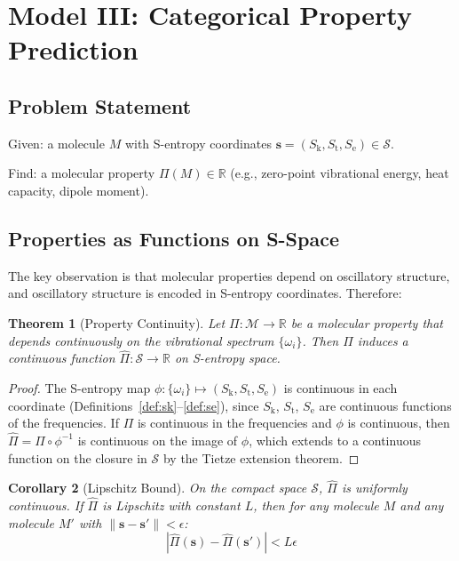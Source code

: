 \documentclass[11pt,twocolumn,a4paper]{article}
\newtheorem{theorem}{Theorem}[section]
\newtheorem{corollary}[theorem]{Corollary}
\theoremstyle{definition}
\theoremstyle{remark}
\newcommand{\Sk}{S_{\mathrm{k}}}
\newcommand{\St}{S_{\mathrm{t}}}
\newcommand{\Se}{S_{\mathrm{e}}}
\newcommand{\Sspace}{\mathcal{S}}
\newcommand{\Real}{\mathbb{R}}
\begin{document}
\section{Model III: Categorical Property Prediction}
\label{sec:model3}

\subsection{Problem Statement}

Given: a molecule $M$ with S-entropy coordinates $\mathbf{s} = (\Sk, \St, \Se) \in \Sspace$.

Find: a molecular property $\Pi(M) \in \Real$ (e.g., zero-point vibrational energy, heat capacity, dipole moment).

\subsection{Properties as Functions on S-Space}

The key observation is that molecular properties depend on oscillatory structure, and oscillatory structure is encoded in S-entropy coordinates. Therefore:

\begin{theorem}[Property Continuity]
\label{thm:property_continuity}
Let $\Pi: \mathcal{M} \to \Real$ be a molecular property that depends continuously on the vibrational spectrum $\{\omega_i\}$. Then $\Pi$ induces a continuous function $\hat{\Pi}: \Sspace \to \Real$ on S-entropy space.
\end{theorem}

\begin{proof}
The S-entropy map $\phi: \{\omega_i\} \mapsto (\Sk, \St, \Se)$ is continuous in each coordinate (Definitions~\ref{def:sk}--\ref{def:se}), since $\Sk$, $\St$, $\Se$ are continuous functions of the frequencies. If $\Pi$ is continuous in the frequencies and $\phi$ is continuous, then $\hat{\Pi} = \Pi \circ \phi^{-1}$ is continuous on the image of $\phi$, which extends to a continuous function on the closure in $\Sspace$ by the Tietze extension theorem.
\end{proof}

\begin{corollary}[Lipschitz Bound]
\label{cor:lipschitz}
On the compact space $\Sspace$, $\hat{\Pi}$ is uniformly continuous. If $\hat{\Pi}$ is Lipschitz with constant $L$, then for any molecule $M$ and any molecule $M'$ with $\|\mathbf{s} - \mathbf{s}'\| < \epsilon$:
\begin{equation}
|\hat{\Pi}(\mathbf{s}) - \hat{\Pi}(\mathbf{s}')| < L \epsilon
\label{eq:lipschitz}
\end{equation}
\end{corollary}
\end{document}
